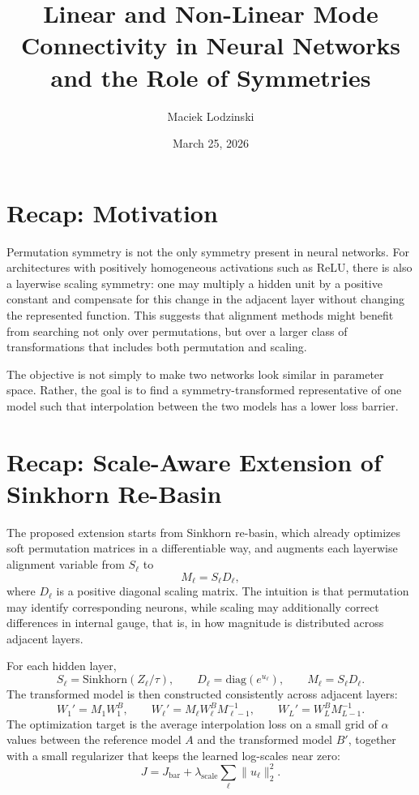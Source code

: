 \documentclass[11pt,a4paper]{article}
\title{Linear and Non-Linear Mode Connectivity in Neural Networks\\and the Role of Symmetries\\ \vspace{0.3cm}}
\author{Maciek Lodzinski}
\date{March 25, 2026}
\begin{document}
\maketitle

\section{Recap: Motivation}

Permutation symmetry is not the only symmetry present in neural networks. For architectures with positively homogeneous activations such as ReLU, there is also a layerwise scaling symmetry: one may multiply a hidden unit by a positive constant and compensate for this change in the adjacent layer without changing the represented function. This suggests that alignment methods might benefit from searching not only over permutations, but over a larger class of transformations that includes both permutation and scaling.

The objective is not simply to make two networks look similar in parameter space. Rather, the goal is to find a symmetry-transformed representative of one model such that interpolation between the two models has a lower loss barrier.

\section{Recap: Scale-Aware Extension of Sinkhorn Re-Basin}
The proposed extension starts from Sinkhorn re-basin, which already optimizes soft permutation matrices in a differentiable way, and augments each layerwise alignment variable from \(S_\ell\) to
\[
M_\ell = S_\ell D_\ell,
\]
where \(D_\ell\) is a positive diagonal scaling matrix. The intuition is that permutation may identify corresponding neurons, while scaling may additionally correct differences in internal gauge, that is, in how magnitude is distributed across adjacent layers.

For each hidden layer,
\[
S_\ell = \mathrm{Sinkhorn}(Z_\ell/\tau), \qquad
D_\ell = \mathrm{diag}(e^{u_\ell}), \qquad
M_\ell = S_\ell D_\ell.
\]
The transformed model is then constructed consistently across adjacent layers:
\[
W_1' = M_1 W_1^B,\qquad
W_\ell' = M_\ell W_\ell^B M_{\ell-1}^{-1},\qquad
W_L' = W_L^B M_{L-1}^{-1}.
\]
The optimization target is the average interpolation loss on a small grid of \(\alpha\) values between the reference model \(A\) and the transformed model \(B'\), together with a small regularizer that keeps the learned log-scales near zero:
\[
J = J_{\mathrm{bar}} + \lambda_{\mathrm{scale}} \sum_\ell \|u_\ell\|_2^2.
\]
\end{document}
